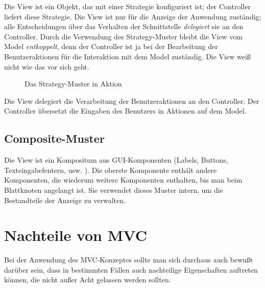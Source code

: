 \documentclass[11pt,a4paper,titlepage]{scrreprt}
\begin{document}
Die View ist ein Objekt, das mit einer Strategie konfiguriert ist; der Controller
liefert diese Strategie. Die View ist nur für die Anzeige der Anwendung zuständig;
alle Entscheidungen über das Verhalten der Schnittstelle {\itshape delegiert} sie an
den Controller. Durch die Verwendung des Strategy-Muster bleibt die View vom
Model {\itshape entkoppelt}, denn der Controller ist ja bei der Bearbeitung der
Benutzeraktionen für die Interaktion mit dem Model zuständig. Die View weiß nicht
wie das vor sich geht.

\begin{figure}[h]
\caption{Das Strategy-Muster in Aktion}
\end{figure}

Die View delegiert die Verarbeitung der Benutzeraktionen an den Controller. Der Controller
übersetzt die Eingaben des Benutzers in Aktionen auf dem Model.

\subsection{Composite-Muster}
Die View ist ein Kompositum aus GUI-Komponenten (Labels, Buttons, Texteingabefentern, usw. ).
Die oberste Komponente enthält andere Komponenten, die wiederum weitere Komponenten enthalten,
bis man beim Blattknoten angelangt ist. Sie verwendet dieses Muster intern, um die Bestandteile
der Anzeige zu verwalten.

\section{Nachteile von MVC}
Bei der Anwendung des MVC-Konzeptes sollte man sich durchaus auch bewußt darüber sein,
dass in bestimmten Fällen auch nachteilige Eigenschaften auftreten können, die nicht 
außer Acht gelassen werden sollten. \citep[vgl. S. xx-xy]{Buschmann199801}
\end{document}
